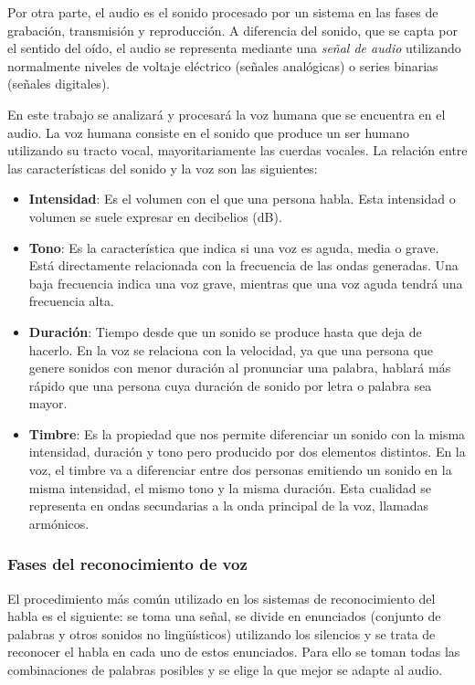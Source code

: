 \documentclass[../main.tex]{subfiles}
\begin{document}
Por otra parte, el audio es el sonido procesado por un sistema en las fases de grabación, transmisión y reproducción. A diferencia del sonido, que se capta por el sentido del oído, el audio se representa mediante una \textit{señal de audio} utilizando normalmente niveles de voltaje eléctrico (señales analógicas) o series binarias (señales digitales).

En este trabajo se analizará y procesará la voz humana que se encuentra en el audio. La voz humana consiste en el sonido que produce un ser humano utilizando su tracto vocal, mayoritariamente las cuerdas vocales. La relación entre las características del sonido y la voz son las siguientes:
\begin{itemize}
    \item \textbf{Intensidad}: Es el volumen con el que una persona habla. Esta intensidad o volumen se suele expresar en decibelios (dB).
    \item \textbf{Tono}: Es la característica que indica si una voz es aguda, media o grave. Está directamente relacionada con la frecuencia de las ondas generadas. Una baja frecuencia indica una voz grave, mientras que una voz aguda tendrá una frecuencia alta.
    \item \textbf{Duración}: Tiempo desde que un sonido se produce hasta que deja de hacerlo. En la voz se relaciona con la velocidad, ya que una persona que genere sonidos con menor duración al pronunciar una palabra, hablará más rápido que una persona cuya duración de sonido por letra o palabra sea mayor.
    \item \textbf{Timbre}: Es la propiedad que nos permite diferenciar un sonido con la misma intensidad, duración y tono pero producido por dos elementos distintos. En la voz, el timbre va a diferenciar entre dos personas emitiendo un sonido en la misma intensidad, el mismo tono y la misma duración. Esta cualidad se representa en ondas secundarias a la onda principal de la voz, llamadas armónicos.
\end{itemize}

\subsubsection{Fases del reconocimiento de voz}

El procedimiento más común utilizado en los sistemas de reconocimiento del habla es el siguiente: se toma una señal, se divide en enunciados (conjunto de palabras y otros sonidos no lingüísticos) utilizando los silencios y se trata de reconocer el habla en cada uno de estos enunciados. Para ello se toman todas las combinaciones de palabras posibles y se elige la que mejor se adapte al audio.
\end{document}
